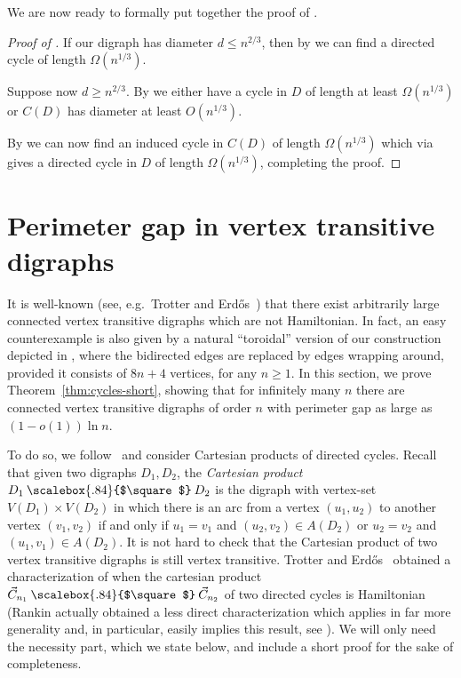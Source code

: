 \documentclass[english,11pt]{article}
\theoremstyle{definition}
\numberwithin{equation}{section}
\numberwithin{figure}{section}
\newcommand\car{\mathbin{\text{\scalebox{.84}{$\square$}}}}
\begin{document}
We are now ready to formally put together the proof of .

\begin{proof}[Proof of ]
    If our digraph has diameter $d \le n^{2/3}$, then by  we can find a directed cycle of length $\Omega(n^{1/3})$. 

    Suppose now $d \ge n^{2/3}$. By  we either have a cycle in $D$ of length at least $\Omega(n^{1/3})$ or $C(D)$ has diameter at least $O(n^{1/3})$. 

    By  we can now find an induced cycle in $C(D)$ of length $\Omega(n^{1/3})$ which via  gives a directed cycle in $D$ of length $\Omega(n^{1/3})$, completing the proof.
\end{proof}


\section{Perimeter gap in vertex transitive digraphs}\label{sec:gap}

It is well-known (see, e.g.\ Trotter and Erd\H{o}s~\cite{TrotterErdos}) that there exist arbitrarily large connected vertex transitive digraphs which are not Hamiltonian. In fact, an easy counterexample is also given by a natural ``toroidal'' version of our construction depicted in , where the bidirected edges are replaced by edges wrapping around, provided it consists of $8n+4$ vertices,  for any $n \ge 1$. In this section, we prove Theorem~\ref{thm:cycles-short}, showing that for infinitely many $n$ there are connected vertex transitive digraphs of order $n$ with perimeter gap as large as $(1-o(1))\ln n$. 

To do so, we follow~\cite{TrotterErdos} and consider Cartesian products of directed cycles. Recall that given two digraphs $D_1, D_2$, the \emph{Cartesian product} $D_1\car D_2$ is the digraph with vertex-set $V(D_1)\times V(D_2)$ in which there is an arc from a vertex $(u_1,u_2)$ to another vertex $(v_1,v_2)$ if and only if $u_1=v_1$ and $(u_2,v_2)\in A(D_2)$ or $u_2=v_2$ and $(u_1, v_1)\in A(D_2)$. It is not hard to check that the Cartesian product of two vertex transitive digraphs is still vertex transitive. Trotter and Erd\H{o}s~\cite{TrotterErdos} obtained a characterization of when the cartesian product $\vec{C}_{n_1}\car \vec{C}_{n_2}$ of two directed cycles is Hamiltonian (Rankin \cite{rankin} actually obtained a less direct characterization which applies in far more generality and, in particular, easily implies this result, see \cite[Section 5]{path-non-hamiltonicity}). We will only need the necessity part, which we state below, and include a short proof for the sake of completeness. %
\end{document}
